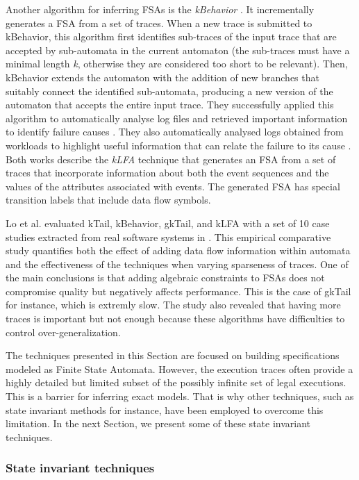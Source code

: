 Another algorithm for inferring FSAs is the \textit{kBehavior}
\cite{mariani2007dynamic}. It incrementally generates a FSA from
a set of traces. When a new trace is submitted to kBehavior, this
algorithm first identifies sub-traces of the input trace that are
accepted by sub-automata in the current automaton (the sub-traces
must have a minimal length \textit{k}, otherwise they are
considered too short to be relevant). Then, kBehavior extends the
automaton with the addition of new branches that suitably connect
the identified sub-automata, producing a new version of the
automaton that accepts the entire input trace. They successfully
applied this algorithm to automatically analyse log files and
retrieved important information to identify failure causes
\cite{4700316}. They also automatically analysed logs obtained
from workloads to highlight useful information that can relate
the failure to its cause \cite{cotroneo2007investigation}.  Both
works describe the \textit{kLFA} technique that generates an FSA
from a set of traces that incorporate information about both the
event sequences and the values of the attributes associated with
events. The generated FSA has special transition labels that
include data flow symbols.

Lo et al. evaluated kTail, kBehavior, gkTail, and kLFA with a set
of 10 case studies extracted from real software systems in
\cite{Lo20122063}. This empirical comparative study quantifies
both the effect of adding data flow information within automata
and the effectiveness of the techniques when varying sparseness
of traces. One of the main conclusions is that adding algebraic
constraints to FSAs does not compromise quality but negatively
affects performance. This is the case of gkTail for instance,
which is extremly slow. The study also revealed that having more
traces is important but not enough because these algorithms have
difficulties to control over-generalization.

The techniques presented in this Section are focused on building
specifications modeled as Finite State Automata. However, the
execution traces often provide a highly detailed but limited
subset of the possibly infinite set of legal executions. This is
a barrier for inferring exact models.
That is why other techniques, such as state invariant methods for
instance, have been employed to overcome this limitation. In the
next Section, we present some of these state invariant
techniques.


\subsubsection{State invariant techniques}
\label{sec:passive-spec}

